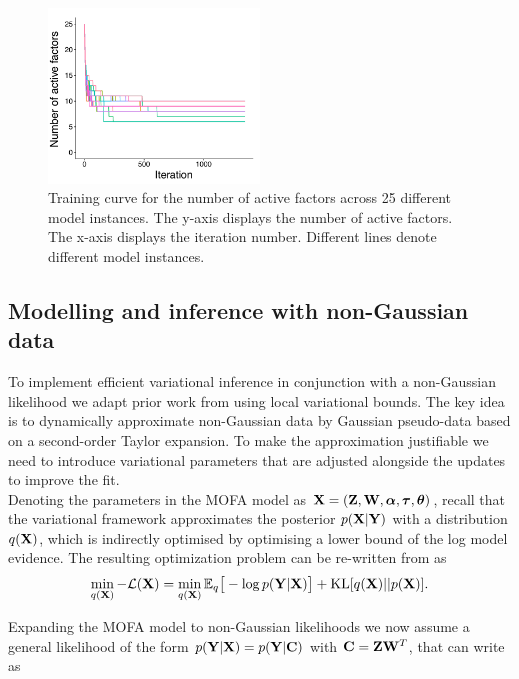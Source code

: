 \begin{figure}[H]
	\centering 	
	\includegraphics[width=0.5\textwidth]{MOFA_nfactors}
	\caption{Training curve for the number of active factors across 25 different model instances. The y-axis displays the number of active factors. The x-axis displays the iteration number. Different lines denote different model instances.}
	\label{fig:MOFA_nfactors}
\end{figure}


\subsection{Modelling and inference with non-Gaussian data} \label{section:non_gaussian}
To implement efficient variational inference in conjunction with a non-Gaussian likelihood we adapt prior work from \cite{seeger} using local variational bounds. The key idea is to dynamically approximate non-Gaussian data by Gaussian pseudo-data based on a second-order Taylor expansion.  To make the approximation justifiable we need to introduce variational parameters that are adjusted alongside the updates to improve the fit.	\\
Denoting the parameters in the MOFA model as ${\bf X}= ({\bf Z},{\bf W},\mbox{\boldmath $\alpha$},\mbox{\boldmath $\tau$},\mbox{\boldmath $\theta$})$, recall that the variational framework approximates the posterior $p({\bf X} | {\bf Y} )$ with a distribution $q({\bf X})$, which is indirectly optimised by optimising a lower bound of the log model evidence. The resulting optimization problem can be re-written from  as
\begin{equation*}
\min_{q({\bf X})} -\mathcal{L}({\bf X}) =  \min_{q({\bf X})} \mathbb{E}_q \big[ -\log p({\bf Y}|{\bf X}) \big] + {\rm KL}[q({\bf X})||p({\bf X})].
\end{equation*}


Expanding the MOFA model to non-Gaussian likelihoods we now assume a general likelihood of the form $p({\bf Y}|{\bf X})=p({\bf Y}|{\bf C})$ with ${\bf C} = {\bf Z}{\bf W}^{T}$, that can write as

